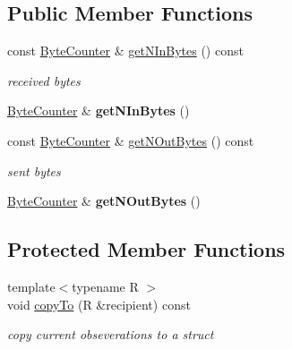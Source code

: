 \subsection*{Public Member Functions}
\begin{DoxyCompactItemize}
\item 
const \hyperlink{classnfd_1_1ByteCounter}{Byte\+Counter} \& \hyperlink{classnfd_1_1LinkLayerCounters_a3a170340a9797acc326d89115572bd55}{get\+N\+In\+Bytes} () const\hypertarget{classnfd_1_1LinkLayerCounters_a3a170340a9797acc326d89115572bd55}{}\label{classnfd_1_1LinkLayerCounters_a3a170340a9797acc326d89115572bd55}

\begin{DoxyCompactList}\small\item\em received bytes \end{DoxyCompactList}\item 
\hyperlink{classnfd_1_1ByteCounter}{Byte\+Counter} \& {\bfseries get\+N\+In\+Bytes} ()\hypertarget{classnfd_1_1LinkLayerCounters_a010ee2e26f6ed7e9f229283a53dbe409}{}\label{classnfd_1_1LinkLayerCounters_a010ee2e26f6ed7e9f229283a53dbe409}

\item 
const \hyperlink{classnfd_1_1ByteCounter}{Byte\+Counter} \& \hyperlink{classnfd_1_1LinkLayerCounters_a458a1f79a5abef6082c49a729841de17}{get\+N\+Out\+Bytes} () const\hypertarget{classnfd_1_1LinkLayerCounters_a458a1f79a5abef6082c49a729841de17}{}\label{classnfd_1_1LinkLayerCounters_a458a1f79a5abef6082c49a729841de17}

\begin{DoxyCompactList}\small\item\em sent bytes \end{DoxyCompactList}\item 
\hyperlink{classnfd_1_1ByteCounter}{Byte\+Counter} \& {\bfseries get\+N\+Out\+Bytes} ()\hypertarget{classnfd_1_1LinkLayerCounters_aaae4fdd7af3d0070f70372dd4f21311e}{}\label{classnfd_1_1LinkLayerCounters_aaae4fdd7af3d0070f70372dd4f21311e}

\end{DoxyCompactItemize}
\subsection*{Protected Member Functions}
\begin{DoxyCompactItemize}
\item 
{\footnotesize template$<$typename R $>$ }\\void \hyperlink{classnfd_1_1LinkLayerCounters_affcb258dbdaa11cb1e6fc8e42b1296a8}{copy\+To} (R \&recipient) const
\begin{DoxyCompactList}\small\item\em copy current obseverations to a struct \end{DoxyCompactList}\end{DoxyCompactItemize}


